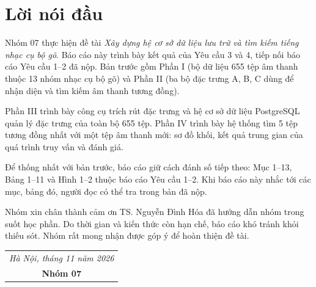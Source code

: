 \documentclass[11pt,a4paper]{article}
\begin{document}
\section*{Lời nói đầu}
Nhóm 07 thực hiện đề tài \emph{Xây dựng hệ cơ sở dữ liệu lưu trữ và tìm kiếm tiếng nhạc cụ bộ gõ}. Báo cáo này trình bày kết quả của Yêu cầu 3 và 4, tiếp nối báo cáo Yêu cầu 1--2 đã nộp. Bản trước gồm Phần I (bộ dữ liệu 655 tệp âm thanh thuộc 13 nhóm nhạc cụ bộ gõ) và Phần II (ba bộ đặc trưng A, B, C dùng để nhận diện và tìm kiếm âm thanh tương đồng).

Phần III trình bày công cụ trích rút đặc trưng và hệ cơ sở dữ liệu PostgreSQL quản lý đặc trưng của toàn bộ 655 tệp. Phần IV trình bày hệ thống tìm 5 tệp tương đồng nhất với một tệp âm thanh mới: sơ đồ khối, kết quả trung gian của quá trình truy vấn và đánh giá.

Để thống nhất với bản trước, báo cáo giữ cách đánh số tiếp theo: Mục 1--13, Bảng 1--11 và Hình 1--2 thuộc báo cáo Yêu cầu 1--2. Khi báo cáo này nhắc tới các mục, bảng đó, người đọc có thể tra trong bản đã nộp.

Nhóm xin chân thành cảm ơn TS. Nguyễn Đình Hóa đã hướng dẫn nhóm trong suốt học phần. Do thời gian và kiến thức còn hạn chế, báo cáo khó tránh khỏi thiếu sót. Nhóm rất mong nhận được góp ý để hoàn thiện đề tài.

\vspace{1cm}
\hfill\begin{tabular}{c}
\textit{Hà Nội, tháng 11 năm 2026}\\
\textbf{Nhóm 07}
\end{tabular}
\clearpage
\end{document}
